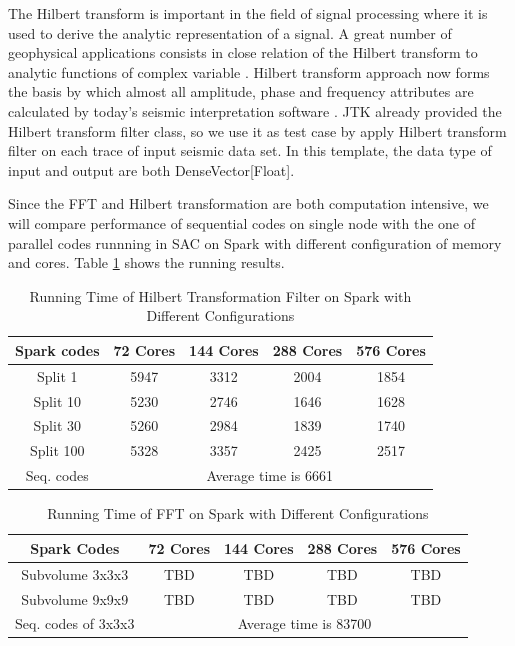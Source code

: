 The Hilbert transform \cite{HilbertWiki} is important in the field of signal processing where it is used to derive the analytic representation of a signal. A great number of geophysical applications consists in close relation of the Hilbert transform to analytic functions of complex variable \cite{HilbertGeoApplication}. Hilbert transform approach now forms the basis by which almost all amplitude, phase and frequency attributes are calculated by today’s seismic interpretation software \cite{HilbertSeismic}. JTK already provided the Hilbert transform filter class, so we use it as test case by apply Hilbert transform filter on each trace of input seismic data set. In this template, the data type of input and output are both DenseVector[Float].  

Since the FFT and Hilbert transformation are both computation intensive, we will compare performance of sequential codes on single node with the one of parallel codes runnning in SAC on Spark with different configuration of memory and cores. Table \ref{table:HilbertSpark} shows the running results.


\begin{table}[h]
\caption{Running Time of Hilbert Transformation Filter on Spark with Different Configurations}
\centering
\begin{tabular}{||c| c c c c ||} 
 \hline
 Spark codes  & 72 Cores & 144 Cores & 288 Cores & 576 Cores \\ [0.5ex] 
 \hline
  Split 1   & 5947 & 3312 & 2004 & 1854 \\
  Split 10  & 5230 & 2746 & 1646 & 1628 \\
  Split 30  & 5260 & 2984 & 1839 & 1740 \\
  Split 100 & 5328 & 3357 & 2425 & 2517 \\
 \hline
 \hline
 Seq. codes & \multicolumn{4}{c||}{Average time is 6661} \\ 
 \hline
\end{tabular}
\label{table:HilbertSpark}
\end{table}

\begin{table}[h]
\caption{Running Time of FFT on Spark with Different Configurations}
\centering
\begin{tabular}{||c| c c c c ||} 
 \hline
 Spark Codes & 72 Cores & 144 Cores & 288 Cores & 576 Cores \\ [0.5ex] 
 \hline
 Subvolume 3x3x3 & TBD & TBD & TBD & TBD \\ 
 Subvolume 9x9x9 & TBD & TBD & TBD & TBD \\ 
 \hline
 \hline
 Seq. codes of 3x3x3 & \multicolumn{4}{c||}{Average time is 83700 } \\ 
 \hline
 \end{tabular}
 \label{table:FFTSpark}
 \end{table}

